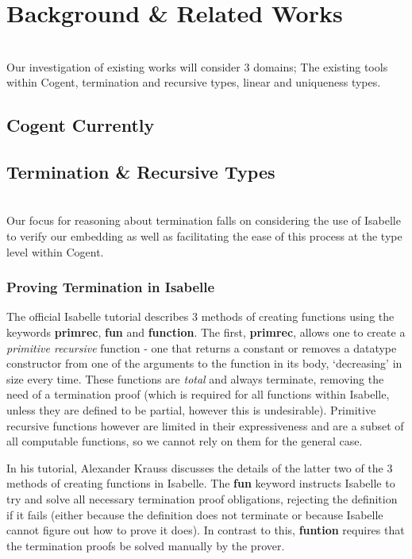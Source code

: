 \chapter{Background \& Related Works}\label{ch:background}
\\
Our investigation of existing works will consider 3 domains; The existing tools within Cogent,
termination and recursive types,  linear and uniqueness types.

\section{Cogent Currently}

\section{Termination \& Recursive Types}
\\
Our focus for reasoning about termination falls on considering the use of Isabelle to verify our 
embedding as well as facilitating the ease of this process at the type level within Cogent. 
\subsection{Proving Termination in Isabelle}

The official Isabelle tutorial\cite{IsabelleTutorial} describes 3 methods of creating functions using the keywords 
\textbf{primrec}, \textbf{fun} and \textbf{function}. The first, \textbf{primrec}, allows one to create a 
\textit{primitive recursive} function - one that returns a constant or removes a datatype constructor from one
of the arguments to the function in its body, `decreasing' in size every time. These functions are \textit{total}
and always terminate, removing the need of a termination proof (which is required for all functions within Isabelle,
unless they are defined to be partial, however this is undesirable).
Primitive recursive functions however are limited in their expressiveness and are a subset of all computable
functions, so we cannot rely on them for the general case.

In his tutorial\cite{KraussIsabelle}, Alexander Krauss discusses the details of the latter two of the 3 methods
of creating functions in Isabelle. The \textbf{fun} keyword instructs Isabelle to try and solve all necessary
termination proof obligations, rejecting the definition if it fails (either because the definition does not 
terminate or because Isabelle cannot figure out how to prove it does). In contrast to this, \textbf{funtion}
requires that the termination proofs be solved manually by the prover.

